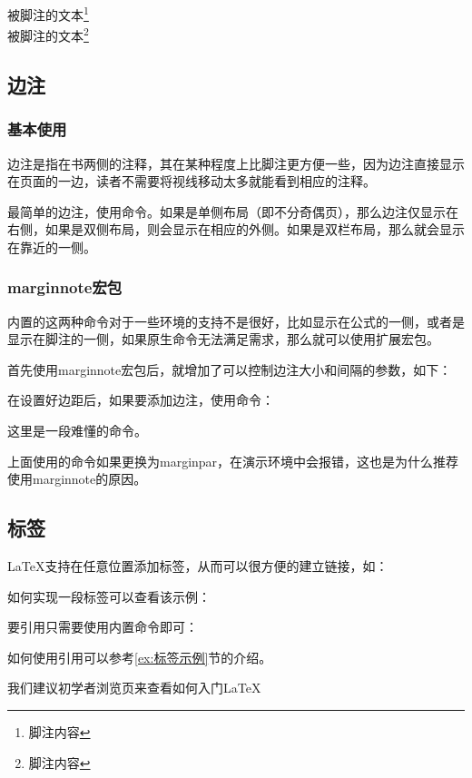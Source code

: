     被脚注的文本\footnote{脚注内容}\\
        \setcounter{footnote}{5}
    被脚注的文本\footnote{脚注内容}

    \subsection{边注}

    \subsubsection{基本使用}
    边注是指在书两侧的注释，其在某种程度上比脚注更方便一些，因为边注直接显示在页面的一边，读者不需要将视线移动太多就能看到相应的注释。

    最简单的边注，使用命令。如果是单侧布局（即不分奇偶页），那么边注仅显示在右侧，如果是双侧布局，则会显示在相应的外侧。如果是双栏布局，那么就会显示在靠近的一侧。

    \subsubsection{marginnote宏包}
    内置的这两种命令对于一些环境的支持不是很好，比如显示在公式的一侧，或者是显示在脚注的一侧，如果原生命令无法满足需求，那么就可以使用扩展宏包。

    首先使用marginnote宏包后，就增加了可以控制边注大小和间隔的参数，如下：
    \begin{texcode}
        \usepackage[top=Bcm, bottom=Hcm, outer=Ccm, inner=Acm, 
            heightrounded, 
            marginparwidth=Ecm, marginparsep=Dcm]{geometry}
    \end{texcode}

    在设置好边距后，如果要添加边注，使用命令：
    \begin{texshow}
        这里是一段难懂的命令。
    \end{texshow}
    
    上面使用的命令如果更换为marginpar，在演示环境中会报错，这也是为什么推荐使用marginnote的原因。

    \subsection{标签}\label{sub:标签}
    \LaTeX{}支持在任意位置添加标签，从而可以很方便的建立链接，如：
    \begin{texshow}
        如何实现一段标签可以查看该示例：\label{ex:标签示例}
    \end{texshow}
    要引用只需要使用内置命令即可：
    \begin{texshow}
        如何使用引用可以参考\ref{ex:标签示例}节的介绍。
    \end{texshow}
    \begin{texshow}
        我们建议初学者浏览\pageref{sub:快速入门}页来查看如何入门\LaTeX{}
    \end{texshow}

